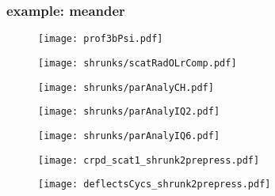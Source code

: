 \begin{frame}
 \frametitle{example: meander}
\begin{figure}
\centering
	\texttt{[image: prof3bPsi.pdf]}
\end{figure}
\end{frame}
\begin{frame}
\begin{figure}
	\centering
	\texttt{[image: shrunks/scatRadOLrComp.pdf]}
\end{figure}
\end{frame}
\begin{frame}
\begin{figure}
	\centering
	\texttt{[image: shrunks/parAnalyCH.pdf]}
\end{figure}
\end{frame}
\begin{frame}
\begin{figure}
	\centering
	\texttt{[image: shrunks/parAnalyIQ2.pdf]}
\end{figure}
\end{frame}
\begin{frame}
\begin{figure}
	\centering
	\texttt{[image: shrunks/parAnalyIQ6.pdf]}
\end{figure}
\end{frame}
\begin{frame}
\begin{figure}
	\centering
	\texttt{[image: crpd\_scat1\_shrunk2prepress.pdf]}
\end{figure}
\end{frame}
\begin{frame}
\begin{figure}
	\centering
	\texttt{[image: deflectsCycs\_shrunk2prepress.pdf]}
\end{figure}
\end{frame}
